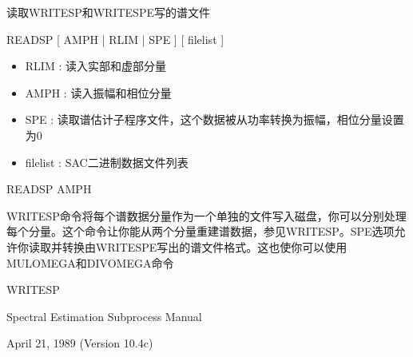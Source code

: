 \label{cmd:readsp}

读取WRITESP和WRITESPE写的谱文件

READSP [ AMPH | RLIM | SPE ] [ filelist ]

\begin{itemize}
\item RLIM :  读入实部和虚部分量 
\item AMPH :  读入振幅和相位分量 
\item SPE : 读取谱估计子程序文件，这个数据被从功率转换为振幅，相位分量设置为0 
\item filelist : SAC二进制数据文件列表 
\end{itemize}

READSP AMPH

WRITESP命令将每个谱数据分量作为一个单独的文件写入磁盘，你可以分别处理每个分量。这个命令让你能从两个分量重建谱数据，参见WRITESP。SPE选项允许你读取并转换由WRITESPE写出的谱文件格式。这也使你可以使用MULOMEGA和DIVOMEGA命令

WRITESP

Spectral Estimation Subprocess Manual

April 21, 1989 (Version 10.4c)
